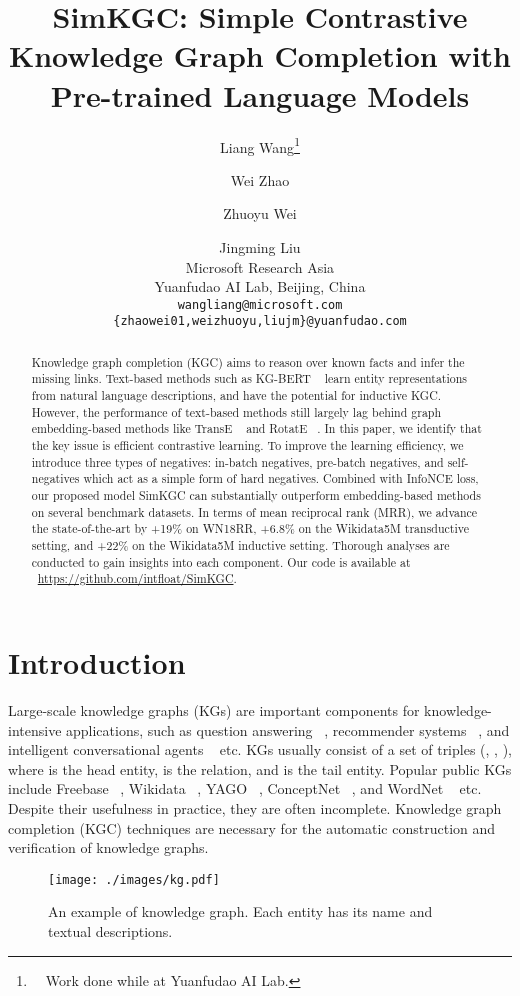 \documentclass[11pt]{article}
\title{SimKGC: Simple Contrastive Knowledge Graph Completion with \\ Pre-trained Language Models}
\author{Liang Wang\thanks{\ \ Work done while at Yuanfudao AI Lab.} \and Wei Zhao \and Zhuoyu Wei \and Jingming Liu \\
        Microsoft Research Asia \\
        Yuanfudao AI Lab, Beijing, China \\
    {\tt wangliang@microsoft.com} \\ {\tt \{zhaowei01,weizhuoyu,liujm\}@yuanfudao.com} \\}
\begin{document}
\maketitle
\begin{abstract}
Knowledge graph completion (KGC) aims to reason over known facts
and infer the missing links.
Text-based methods such as KG-BERT ~\citep{yao2019kg}
learn entity representations from natural language descriptions,
and have the potential for inductive KGC.
However,
the performance of text-based methods still largely lag behind
graph embedding-based methods
like TransE ~\citep{bordes2013translating} and RotatE ~\citep{sun2018rotate}.
In this paper,
we identify that the key issue is efficient contrastive learning.
To improve the learning efficiency,
we introduce three types of negatives:
in-batch negatives,
pre-batch negatives,
and self-negatives which act as a simple form of hard negatives.
Combined with InfoNCE loss,
our proposed model SimKGC can substantially outperform embedding-based methods
on several benchmark datasets.
In terms of mean reciprocal rank (MRR),
we advance the state-of-the-art by +19\% on WN18RR,
+6.8\% on the Wikidata5M transductive setting,
and +22\% on the Wikidata5M inductive setting.
Thorough analyses are conducted to gain insights into each component.
Our code is available at ~\url{https://github.com/intfloat/SimKGC}.
\end{abstract}

\section{Introduction}
Large-scale knowledge graphs (KGs) are important components for knowledge-intensive applications,
such as question answering ~\citep{sun-etal-2019-pullnet},
recommender systems ~\citep{Huang2018ImprovingSR},
and intelligent conversational agents ~\citep{Dinan2019WizardOW} etc.
KGs usually consist of a set of triples (, , ),
where  is the head entity,  is the relation, and  is the tail entity.
Popular public KGs include Freebase ~\citep{bollacker2008freebase},
Wikidata ~\citep{vrandevcic2014wikidata},
YAGO ~\citep{suchanek2007yago},
ConceptNet ~\citep{speer2017conceptnet},
and WordNet ~\citep{miller1995wordnet} etc.
Despite their usefulness in practice,
they are often incomplete.
Knowledge graph completion (KGC) techniques are necessary for the automatic construction
and verification of knowledge graphs.

\begin{figure}[ht]
\begin{center}
 \texttt{[image: ./images/kg.pdf]}
 \caption{An example of knowledge graph.
 Each entity has its name and textual descriptions.}
 \label{fig:kg}
\end{center}
\end{figure}
\end{document}

